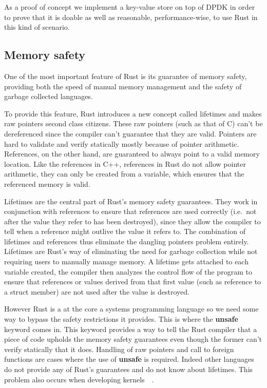 As a proof of concept we implement a key-value store on top of
DPDK in order to prove that it is doable as well as reasonable,
performance-wise, to use Rust in this kind of scenario.


\subsection{Memory safety}

One of the most important feature of Rust is its guarantee of memory
safety, providing both the speed of manual memory management and the
safety of garbage collected languages.

To provide this feature, Rust introduces a new concept called
lifetimes and makes raw pointers second class citizens. These raw
pointers (such as that of C) can't be dereferenced since the compiler
can't guarantee that they are valid. Pointers are hard to validate and
verify statically mostly because of pointer arithmetic. References, on
the other hand, are guaranteed to always point to a valid memory
location. Like the references in C++, references in Rust do not allow
pointer arithmetic, they can only be created from a variable, which
ensures that the referenced memory is valid.

Lifetimes are the central part of Rust's memory safety
guarantees. They work in conjunction with references to ensure
that references are used correctly (i.e.\ not after the value they
refer to has been destroyed), since they allow the compiler to tell
when a reference might outlive the value it refers to. The combination
of lifetimes and references thus eliminate the dangling pointers
problem entirely. Lifetimes are Rust's way of eliminating the need for
garbage collection while not requiring users to manually manage
memory. A lifetime gets attached to each variable created, the
compiler then analyzes the control flow of the program to ensure that
references or values derived from that first value (such as reference
to a struct member) are not used after the value is destroyed.

However Rust is a at the core a systems programming language so we
need some way to bypass the safety restrictions it provides. This is
where the \textbf{unsafe}~\cite{rustonomicon} keyword comes in. This
keyword provides a way to tell the Rust compiler that a piece of code
upholds the memory safety guarantees even though the former can't
verify  statically that it does. Handling of raw pointers and call to
foreign functions are cases where the use of \textbf{unsafe} is
required. Indeed other languages do not provide any of Rust's
guarantees and do not know about lifetimes. This problem also occurs
when developing kernels~\cite{rust-os}~\cite{redox}.

